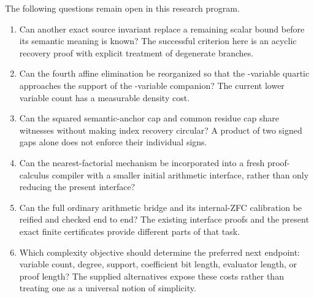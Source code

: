 \documentclass[11pt,letterpaper]{article}
\theoremstyle{remark}\newtheorem{remark}[theorem]{Remark}
\begin{document}
The following questions remain open in this research program.
\begin{enumerate}
\item Can another exact source invariant replace a remaining scalar bound before its semantic meaning is known? The successful criterion here is an acyclic recovery proof with explicit treatment of degenerate branches.
\item Can the fourth affine elimination be reorganized so that the \MainVariables{}-variable quartic approaches the support of the \BalancedVariables{}-variable companion? The current lower variable count has a measurable density cost.
\item Can the squared semantic-anchor cap and common residue cap share witnesses without making index recovery circular? A product of two signed gaps alone does not enforce their individual signs.
\item Can the nearest-factorial mechanism be incorporated into a fresh proof-calculus compiler with a smaller initial arithmetic interface, rather than only reducing the present interface?
\item Can the full ordinary arithmetic bridge and its internal-ZFC calibration be reified and checked end to end? The existing interface proofs and the present exact finite certificates provide different parts of that task.
\item Which complexity objective should determine the preferred next endpoint: variable count, degree, support, coefficient bit length, evaluator length, or proof length? The supplied alternatives expose these costs rather than treating one as a universal notion of simplicity.
\end{enumerate}
\end{document}

